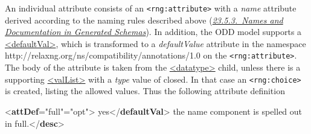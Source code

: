 An individual attribute consists of an \texttt{<rng:attribute>} with a {\itshape name} attribute derived according to the naming rules described above (\textit{\hyperref[IM-naming]{23.5.3.\ Names and Documentation in Generated Schemas}}). In addition, the ODD model supports a \hyperref[TEI.defaultVal]{<defaultVal>}, which is transformed to a {\itshape defaultValue} attribute in the namespace \textsf{http://relaxng.org/ns/compatibility/annotations/1.0} on the \texttt{<rng:attribute>}. The body of the attribute is taken from the \hyperref[TEI.datatype]{<datatype>} child, unless there is a supporting \hyperref[TEI.valList]{<valList>} with a {\itshape type} value of closed. In that case an \texttt{<rng:choice>} is created, listing the allowed values. Thus the following attribute definition \par\bgroup{}\exampleFont \begin{shaded}\noindent\mbox{}{<\textbf{attDef}\hspace*{1em}{ident}="{full}"\hspace*{1em}{usage}="{opt}">}\mbox{}\newline 
{}yes{</\textbf{defaultVal}>}\mbox{}\newline 
{}\mbox{}\newline 
\hspace*{1em}\mbox{}\newline 
\hspace*{1em}\hspace*{1em}the name component is spelled out in full.{</\textbf{desc}>}\mbox{}\newline 

\end{shaded}

